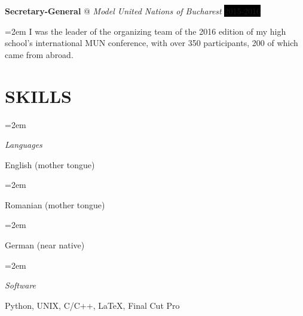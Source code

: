 \documentclass[paper=a4,fontsize=11pt]{scrartcl}
\makeatletter
\newlength{\spacebox}
\newcommand{\NewPart}[1]{\section*{\uppercase{#1}}}
\newcommand{\PersonalEntry}[2]{
		\noindent\hangindent=2em\hangafter=0 %
		\parbox{\spacebox}{        %
		\textit{#1}}		       %
		\hspace{1.5em} #2 \par}    %
\newcommand{\SkillsEntry}[2]{      %
		\noindent\hangindent=2em\hangafter=0 %
		\parbox{\spacebox}{        %
		\textit{#1}}			   %
		\hspace{1.5em} #2 \par}    %
\newcommand{\EducationEntry}[4]{
		\noindent \textbf{#1} \hfill      %
		\colorbox{Black}{%
			\parbox{6em}{%
			\hfill\color{White}#2}} \par  %
		\noindent \textit{#3} \par        %
		\noindent\hangindent=2em\hangafter=0 \small #4 %
		\normalsize \par}
\newcommand{\WorkEntry}[4]{				  %
		\noindent \textbf{#1} @ \textit{#3} \hfill      %
		\colorbox{Black}{\color{White}#2} \par  %
		\noindent\hangindent=2em\hangafter=0 \small #4 %
		\normalsize \par}
\makeatother
\begin{document}
\WorkEntry{Secretary-General}{2015-2016}{Model United Nations of Bucharest}{ I was the leader of the organizing team of the 2016 edition of my high school’s international MUN conference, with over 350 participants, 200 of which came from abroad.}

\NewPart{Skills}{}

\SkillsEntry{Languages}{English (mother tongue)}
\SkillsEntry{}{Romanian (mother tongue)}
\SkillsEntry{}{German (near native)}

\SkillsEntry{Software}{Python, \textsc{UNIX}, \textsc{C/C++}, \LaTeX, Final Cut Pro}


\end{document}
